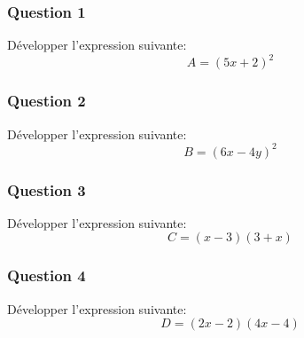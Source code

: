 \documentclass[t,12pt]{beamer}
\begin{document}
\begin{frame}
\frametitle{Question 1}
Développer l'expression suivante:
$$A = (5x+2)^2$$

\end{frame}

\begin{frame}
\frametitle{Question 2}
Développer l'expression suivante:
$$B = (6x-4y)^2$$
\end{frame}

\begin{frame}
\frametitle{Question 3}
Développer l'expression suivante:
$$C = (x-3)(3+x)$$

\end{frame}

\begin{frame}
\frametitle{Question 4}

Développer l'expression suivante:
$$D = (2x-2)(4x-4)$$

\end{frame}
\end{document}
